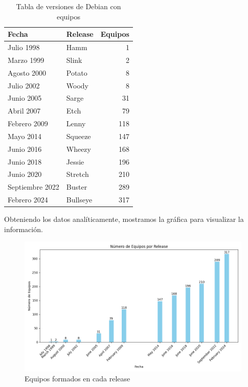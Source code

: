 \documentclass[a4paper, 12pt]{book}
\begin{document}
\begin{table}[h]
	\begin{center}
		\begin{tabular}{|l|l|r|}
			\hline
			Fecha         & Release  & Equipos \\ \hline
			Julio 1998     & Hamm     & 1       \\ \hline
			Marzo 1999     & Slink    & 2       \\ \hline
			Agosto 2000    & Potato   & 8       \\ \hline
			Julio 2002     & Woody    & 8       \\ \hline
			Junio 2005     & Sarge    & 31      \\ \hline
			Abril 2007     & Etch     & 79      \\ \hline
			Febrero 2009   & Lenny    & 118     \\ \hline
			Mayo 2014      & Squeeze  & 147     \\ \hline
			Junio 2016     & Wheezy   & 168     \\ \hline
			Junio 2018     & Jessie   & 196     \\ \hline
			Junio 2020     & Stretch  & 210     \\ \hline
			Septiembre 2022 & Buster   & 289     \\ \hline
			Febrero 2024   & Bullseye & 317     \\ \hline
		\end{tabular}
	\end{center}
	\caption{Tabla de versiones de Debian con equipos}
\end{table}


Obteniendo los datos analíticamente, mostramos la gráfica para visualizar la información.

\begin{figure}
	\centering
	\includegraphics[width=15cm, keepaspectratio]{img/Figura3_buena_equipos.png}
	\caption{Equipos formados en cada release}
	\label{fig:equipos}
\end{figure}
\end{document}
